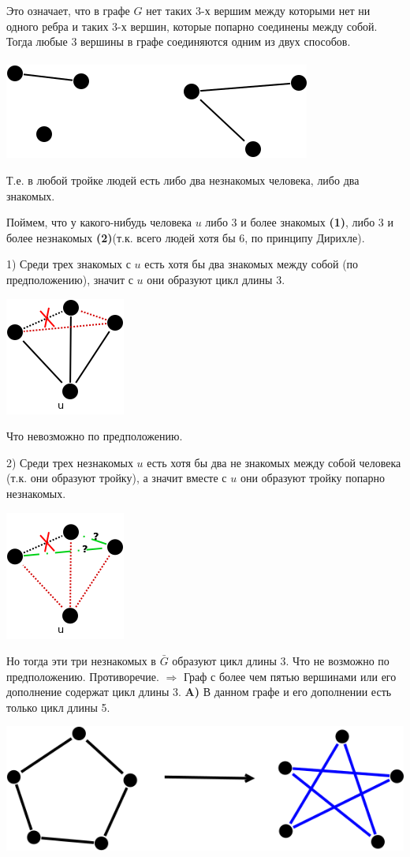 \documentclass{article}
\begin{document}
Это означает, что в графе $ G $ нет таких 3-х вершим между которыми нет ни одного ребра и таких 3-х вершин, которые попарно соединены между собой.
Тогда любые 3 вершины в графе соединяются одним из двух способов.
\\
\\

\includegraphics[scale=0.5]{6_1.png} 


Т.е. в любой тройке людей есть либо два незнакомых человека, либо два знакомых. 

Поймем, что у какого-нибудь человека $u$ либо 3 и более знакомых \textbf{(1)}, либо 3 и более незнакомых \textbf{(2)}(т.к. всего людей хотя бы 6, по принципу Дирихле).

1) Среди трех знакомых с $u$ есть хотя бы два знакомых между собой (по предположению), значит с  $u$ они образуют цикл длины 3.
 
\includegraphics[scale=0.5]{6_2.png}

Что невозможно по предположению.

2) Среди трех незнакомых $u$ есть хотя бы два не знакомых между собой человека (т.к. они образуют тройку), а значит вместе с $u$ они образуют тройку попарно незнакомых.

\includegraphics[scale=0.5]{6_3.png}

Но тогда эти три незнакомых в $\bar{G}$ образуют цикл длины 3.
Что не возможно по предположению.
Противоречие. $\Rightarrow$ Граф с более чем пятью вершинами или его дополнение содержат цикл длины 3.
\newpage
\textbf{A)} В данном графе и его дополнении есть только цикл длины 5.

\includegraphics[scale=0.5]{6_4.png}
\end{document}
